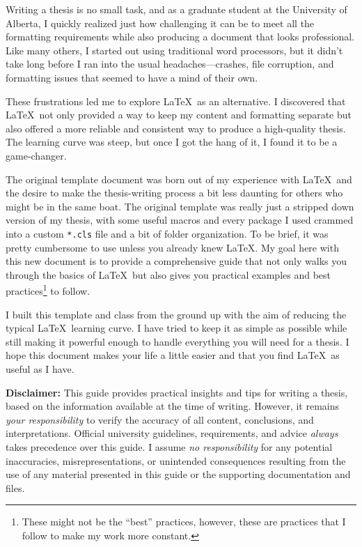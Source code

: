 Writing a thesis is no small task, and as a graduate student at the University of Alberta, I quickly realized just how challenging it can be to meet all the formatting requirements while also producing a document that looks professional. 
Like many others, I started out using traditional word processors, but it didn't take long before I ran into the usual headaches—crashes, file corruption, and formatting issues that seemed to have a mind of their own.

These frustrations led me to explore \LaTeX\ as an alternative. 
I discovered that \LaTeX\ not only provided a way to keep my content and formatting separate but also offered a more reliable and consistent way to produce a high-quality thesis. 
The learning curve was steep, but once I got the hang of it, I found it to be a game-changer.

The original template document was born out of my experience with \LaTeX\ and the desire to make the thesis-writing process a bit less daunting for others who might be in the same boat. 
The original template was really just a stripped down version of my thesis, with some useful macros and every package I used crammed into a custom \texttt{*.cls} file and a bit of folder organization.
To be brief, it was pretty cumbersome to use unless you already knew \LaTeX.
My goal here with this new document is to provide a comprehensive guide that not only walks you through the basics of \LaTeX\ but also gives you practical examples and best practices\footnote{These might not be the ``best'' practices, however, these are practices that I follow to make my work more constant.} to follow.

I built this template and class from the ground up with the aim of reducing the typical \LaTeX\ learning curve. 
I have tried to keep it as simple as possible while still making it powerful enough to handle everything you will need for a thesis. 
I hope this document makes your life a little easier and that you find \LaTeX\ as useful as I have.

\textbf{Disclaimer:} This guide provides practical insights and tips for writing a thesis, based on the information available at the time of writing. 
However, it remains \textit{your responsibility} to verify the accuracy of all content, conclusions, and interpretations. 
Official university guidelines, requirements, and advice \textit{always} takes precedence over this guide. 
I assume \textit{no responsibility} for any potential inaccuracies, misrepresentations, or unintended consequences resulting from the use of any material presented in this guide or the supporting documentation and files.